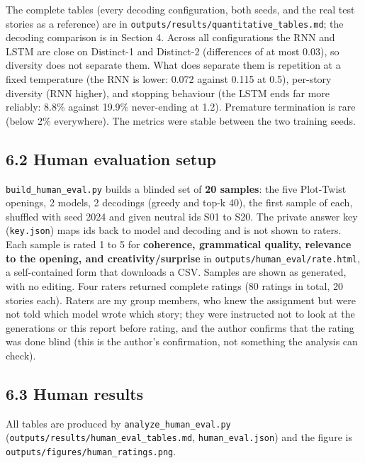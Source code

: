 \documentclass[10pt,a4paper]{article}
\begin{document}
The complete tables (every decoding configuration, both seeds, and the real test stories as a reference) are in
\texttt{outputs/results/quantitative\_tables.md}; the decoding comparison is in Section 4. Across all configurations the RNN and LSTM
are close on Distinct-1 and Distinct-2 (differences of at most 0.03), so diversity does not separate them. What does separate
them is repetition at a fixed temperature (the RNN is lower: 0.072 against 0.115 at 0.5), per-story diversity
(RNN higher), and stopping behaviour (the LSTM ends far more reliably: 8.8\% against 19.9\% never-ending at 1.2).
Premature termination is rare (below 2\% everywhere). The metrics were stable between the two training seeds.

\hypertarget{human-evaluation-setup}{%
\subsection{6.2 Human evaluation setup}\label{human-evaluation-setup}}

\texttt{build\_human\_eval.py} builds a blinded set of \textbf{20 samples}: the five Plot-Twist openings, 2 models, 2 decodings (greedy and
top-k 40), the first sample of each, shuffled with seed 2024 and given neutral ids S01 to S20. The private answer key (\texttt{key.json}) maps ids back to model
and decoding and is not shown to raters. Each sample is rated 1 to 5 for \textbf{coherence, grammatical quality, relevance
to the opening, and creativity/surprise} in \texttt{outputs/human\_eval/rate.html}, a self-contained form that downloads a CSV. Samples are
shown as generated, with no editing. Four raters returned complete ratings (80 ratings in total, 20 stories each). Raters are my group members, who knew the
assignment but were not told which model wrote which story; they were instructed not to look at the generations or this report before rating, and the author confirms that the rating was done blind (this is the author's confirmation, not something the analysis can check).

\hypertarget{human-results}{%
\subsection{6.3 Human results}\label{human-results}}

All tables are produced by \texttt{analyze\_human\_eval.py} (\texttt{outputs/results/human\_eval\_tables.md}, \texttt{human\_eval.json}) and the figure is
\texttt{outputs/figures/human\_ratings.png}.
\end{document}
